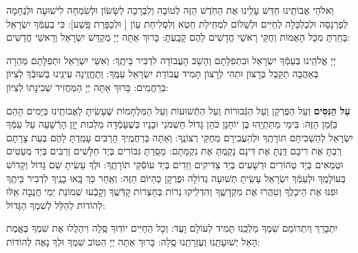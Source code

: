 \documentclass[twoside, openany, parskip=half, 11pt]{book}
\begin{document}
 וֵאלֹהֵי אֲבוֹתֵֽינוּ חַדֵּשׁ עָלֵֽינוּ אֶת הַחֹֽדֶשׁ הַזֶּה לְטוֹבָה וְלִבְרָכָה לְשָׂשׂוֹן וּלְשִׂמְחָה לִישׁוּעָה וּלְנֶחָמָה לְפַרְנָסָה וּלְכַלְכָּלָה לְחַיִּים וּלְשָׁלוֹם לִמְחִֽילַת חֵטְא וְלִסְלִיחַת עָוֹן [
 וּלְכַפָּרַת פָּֽשַׁע]: כִּי בְעַמְּֿךָ יִשְׂרָאֵל בָּחַֽרְתָּ מִכָּל הָאֻמּוֹת וְחֻקֵּי רָאשֵׁי חֳדָשִׁים לָהֶם קָבָֽעְתָּ: בָּרוּךְ אַתָּה יְיָ מְקַדֵּשׁ יִשְׂרָאֵל וְרָאשֵׁי חֳדָשִׁים: 

\nextpage
{}
 יְיָ אֱלֹהֵֽינוּ בְּעַמְּֿךָ יִשְׂרָאֵל וּבִתְפִלָּתָם וְהָשֵׁב הָעֲבוֹדָה לִדְבִיר בֵּיתֶֽךָ: וְאִשֵּׁי יִשְׂרָאֵל וּתְפִלָּתָם מְהֵרָה בְּאַהֲבָה תְקַבֵּל בְּרָצוֹן וּתְהִי לְרָצוֹן תָּמִיד עֲבוֹדַת יִשְׂרָאֵל עַמֶּֽךָ: וְתֶחֱזֶֽינָה עֵינֵֽינוּ בְּשׁוּבְֿךָ לְצִיּוֹן בְּרַחֲמִים: בָּרוּךְ אַתָּה יְיָ הַמַּחֲזִיר שְׁכִינָתוֹ לְצִיּוֹן:

\modim

\enlargethispage{\baselineskip}

\begin{sometimes}

\textbf{עַל הַנִּסִּים}
 וְעַל הַפֻּרְקָן וְעַל הַגְּֿבוּרוֹת וְעַל הַתְּֿשׁוּעוֹת וְעַל הַמִּלְחָמוֹת 
שֶׁעָשִֽׂיתָ לַאֲבוֹתֵֽינוּ בַּיָּמִים הָהֵם בַּזְּֿמַן הַזֶּה:
 בִּימֵי מַתִּתְיָֽהוּ בֶּן יוֹחָנָן כֹּהֵן גָּדוֹל חַשְׁמֹנַי וּבָנָיו כְּשֶׁעָמְֿדָה מַלְכוּת יָוָן הָרְֿשָׁעָה עַל עַמְּֿךָ יִשְׂרָאֵל לְהַשְׁכִּיחָם תּוֹרָתֶֽךָ וּלְהַעֲבִירָם מֵחֻקֵּי רְצוֹנֶֽךָ: וְאַתָּה בְּרַחֲמֶֽיךָ הָרַבִּים עָמַֽדְתָּ לָהֶם בְּעֵת צָרָתָם רַֽבְתָּ אֶת רִיבָם דַּֽנְתָּ אֶת דִּינָם נָקַֽמְתָּ אֶת נִקְמָתָם: מָסַֽרְתָּ גִּבּוֹרִים בְּיַד חַלָּשִׁים וְרַבִּים בְּיַד מְעַטִּים וּטְמֵאִים בְּיַד טְהוֹרִים וּרְשָׁעִים בְּיַד צַדִּיקִים וְזֵדִים בְּיַד עוֹסְֿקֵי תוֹרָתֶֽךָ: וּלְךָ עָשִֽׂיתָ שֵׁם גָּדוֹל וְקָדוֹשׁ בְּעוֹלָמֶֽךָ וּלְעַמְּֿךָ יִשְׂרָאֵל עָשִֽׂיתָ תְּשׁוּעָה גְדוֹלָה וּפֻרְקָן כְּהַיּוֹם הַזֶּה: וְאַֽחַר כַּךְ בָּֽאוּ בָנֶֽיךָ לִדְבִיר בֵּיתֶֽךָ וּפִנּוּ אֶת הֵיכָלֶֽךָ וְטִהֲרוּ אֶת מִקְדָּשֶֽׁךָ וְהִדְלִֽיקוּ נֵרוֹת בְּחַצְרוֹת קָדְּֿשֶֽׁךָ וְקָבְֿעוּ שְׁמוֹנַת יְמֵי חֲנֻכָּה אֵֽלּוּ לְהוֹדוֹת לְהַלֵּל לְשִׁמְךָ הַגָּדוֹל: 

\end{sometimes}

\nextpage

 יִתְבָּרַךְ וְיִתְרוֹמַם שִׁמְךָ מַלְכֵּֽנוּ תָּמִיד לְעוֹלָם וָעֶד: 
וְכָל הַחַיִּים יוֹדֽוּךָ סֶּֽלָה וִיהַלֲלוּ אֶת שִׁמְךָ בֶּאֱמֶת הָאֵל יְשׁוּעָתֵֽנוּ וְעֶזְרָתֵֽנוּ סֶֽלָה: בָּרוּךְ אַתָּה יְיָ הַטּוֹב שִׁמְךָ וּלְךָ נָאֶה לְהוֹדוֹת:

\end{document}
